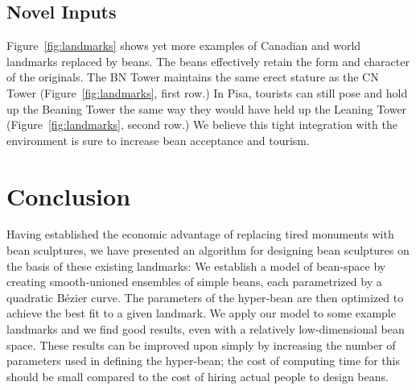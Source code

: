 \documentclass[%
reprint,
twocolumn,
nofootinbib,
 amsmath,amssymb,
 aps,
]{revtex4-2}
\begin{document}
\subsection{Novel Inputs}

Figure~\ref{fig:landmarks} shows yet more examples of Canadian and world landmarks replaced by beans. The beans effectively retain the form and character of the originals. The BN Tower maintains the same erect stature as the CN Tower (Figure~\ref{fig:landmarks}, first row.) In Pisa, tourists can still pose and hold up the Beaning Tower the same way they would have held up the Leaning Tower (Figure~\ref{fig:landmarks}, second row.) We believe this tight integration with the environment is sure to increase bean acceptance and tourism.


\section{Conclusion}
\label{section:conclusion}

Having established the economic advantage of replacing tired monuments with bean sculptures, we have presented an algorithm for designing bean sculptures on the basis of these existing landmarks: We establish a model of bean-space by creating smooth-unioned ensembles of simple beans, each parametrized by a quadratic B\'ezier curve. The parameters of the hyper-bean are then optimized to achieve the best fit to a given landmark. We apply our model to some example landmarks and we find good results, even with a relatively low-dimensional bean space. These results can be improved upon simply by increasing the number of parameters used in defining the hyper-bean; the cost of computing time for this should be small compared to the cost of hiring actual people to design beans. 
\end{document}
